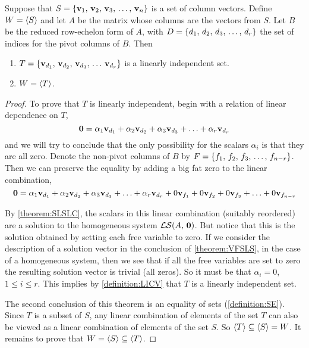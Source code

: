 \documentclass{ximera}
\begin{document}
\begin{theorem}
  \label{theorem:BS}Suppose that $S=\left\{\mathbf{v}_{1},\,\mathbf{v}_{2},\,\mathbf{v}_{3},\,\ldots,\,\mathbf{v}_{n}\right\}$ is a set
  of column vectors.  Define $W=\left\langle S\right\rangle$ and let $A$ be the matrix
  whose columns are the vectors from $S$.  Let $B$ be the reduced
  row-echelon form of $A$, with $D=\left\{{d}_{1},\,{d}_{2},\,{d}_{3},\,\ldots,\,{d}_{r}\right\}$ the set of
  indices for the pivot columns of $B$.  Then
  \begin{enumerate}
  \item $T=\left\{\mathbf{v}_{d_1},\,\mathbf{v}_{d_2},\,\mathbf{v}_{d_3},\,\ldots\,\mathbf{v}_{d_r}\right\}$ is a linearly independent set.
  \item $W=\left\langle T\right\rangle$.
  \end{enumerate}

  \begin{proof}
    To prove that $T$ is linearly independent, begin with a relation of linear dependence on $T$,
    \[
      \mathbf{0}=
      \alpha_1\mathbf{v}_{d_1}+\alpha_2\mathbf{v}_{d_2}+\alpha_3\mathbf{v}_{d_3}+\ldots+\alpha_r\mathbf{v}_{d_r}
    \]
    and we will try to conclude that the only possibility for the scalars $\alpha_i$ is that they are all zero.
    Denote the non-pivot columns of $B$ by $F=\left\{{f}_{1},\,{f}_{2},\,{f}_{3},\,\ldots,\,{f}_{n-r}\right\}$.  Then we can preserve the equality by adding a big fat zero to the linear combination,
    \[
      \mathbf{0}=
      \alpha_1\mathbf{v}_{d_1}+\alpha_2\mathbf{v}_{d_2}+\alpha_3\mathbf{v}_{d_3}+\ldots+\alpha_r\mathbf{v}_{d_r}+
      0\mathbf{v}_{f_1}+0\mathbf{v}_{f_2}+0\mathbf{v}_{f_3}+\ldots+0\mathbf{v}_{f_{n-r}}
    \]
    
    By \ref{theorem:SLSLC}, the scalars in this linear combination
    (suitably reordered) are a solution to the homogeneous system
    $\mathcal{LS}\!\left(A,\,\mathbf{0}\right)$.  But notice that this is the solution obtained
    by setting each free variable to zero.  If we consider the
    description of a solution vector in the conclusion of
    \ref{theorem:VFSLS}, in the case of a homogeneous system, then we
    see that if all the free variables are set to zero the resulting
    solution vector is trivial (all zeros).  So it must be that
    $\alpha_i=0$, $1\leq i\leq r$.  This implies by
    \ref{definition:LICV} that $T$ is a linearly independent set.

    The second conclusion of this theorem is an equality of sets
    (\ref{definition:SE}).  Since $T$ is a subset of $S$, any linear
    combination of elements of the set $T$ can also be viewed as a
    linear combination of elements of the set $S$.  So
    $\left\langle T\right\rangle\subseteq\left\langle S\right\rangle=W$.  It remains to prove that
    $W=\left\langle S\right\rangle\subseteq\left\langle T\right\rangle$.


\end{proof}
\end{theorem}
\end{document}
